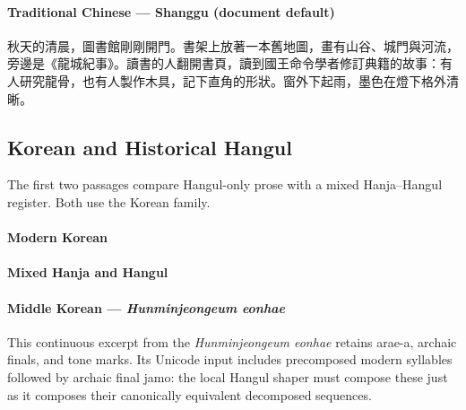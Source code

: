 \documentclass[11pt,twoside]{impeart}
\begin{document}
\paragraph{Traditional Chinese --- Shanggu (document default)}
秋天的清晨，圖書館剛剛開門。書架上放著一本舊地圖，畫有山谷、城門與河流，旁邊是《龍城紀事》。讀書的人翻開書頁，讀到國王命令學者修訂典籍的故事：有人研究龍骨，也有人製作木具，記下直角的形狀。窗外下起雨，墨色在燈下格外清晰。

\subsection{Korean and Historical Hangul}

The first two passages compare Hangul-only prose with a mixed
Hanja--Hangul register. Both use the Korean family.

\paragraph{Modern Korean}

\paragraph{Mixed Hanja and Hangul}

\paragraph{Middle Korean --- \emph{Hunminjeongeum eonhae}}
This continuous excerpt from the \emph{Hunminjeongeum eonhae}
retains arae-a, archaic finals, and tone marks. Its Unicode input
includes precomposed modern syllables followed by archaic final jamo:
the local Hangul shaper must compose these just as it composes their
canonically equivalent decomposed sequences.

\end{document}
